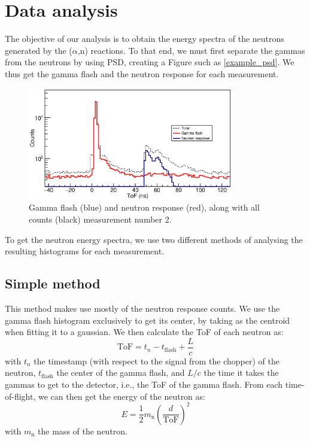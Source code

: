 \documentclass[a4paper,12pt]{report}
\newcommand{\an}{($\alpha$,n) }
\begin{document}
\section{Data analysis}
The objective of our analysis is to obtain the energy spectra of the neutrons generated by the \an reactions.
To that end, we must first separate the gammas from the neutrons by using PSD, creating a Figure such as \ref{example_psd}.
We thus get the gamma flash and the neutron response for each measurement.

\begin{figure}[H]
	\centering
	\includegraphics[width=0.80\textwidth]{separated_tof.eps}
	\caption{Gamma flash (blue) and neutron response (red), along with all counts (black) measurement number 2.}
	\label{separated_tof}
\end{figure}

To get the neutron energy spectra, we use two different methods of analysing the resulting histograms for each measurement.

\subsection{Simple method}
This method makes use mostly of the neutron response counts.
We use the gamma flash histogram exclusively to get its center, by taking as the centroid when fitting it to a gaussian.
We then calculate the ToF of each neutron as:
\begin{equation}
	\text{ToF} = t_n-t_\text{flash}+\frac{L}{c}
\end{equation}
with $t_n$ the timestamp (with respect to the signal from the chopper) of the neutron, $t_\text{flash}$ the center of the gamma flash, and $L/c$ the time it takes the gammas to get to the detector, i.e., the ToF of the gamma flash.
From each time-of-flight, we can then get the energy of the neutron as:
\begin{equation}
	E=\frac{1}{2} m_\text{n} \left( \frac{d}{\text{ToF}} \right)^2
\end{equation}
with $m_\text{n}$ the mass of the neutron.
\end{document}
